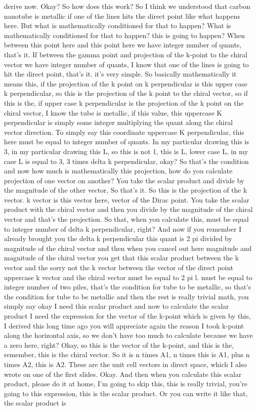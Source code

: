 derive now. Okay? So how does this work? So I think we understood that carbon nanotube is metallic if one of the lines hits the direct point like what happens here. But what is mathematically conditioned for that to happen? What is mathematically conditioned for that to happen? this is going to happen? When between this point here and this point here we have integer number of quants, that's it. If between the gamma point and projection of the k-point to the chiral vector we have integer number of quants, I know that one of the lines is going to hit the direct point, that's it. it's very simple. So basically mathematically it means this, if the projection of the k point on k perpendicular is this upper case k perpendicular, so this is the projection of the k point to the chiral vector, so if this is the, if upper case k perpendicular is the projection of the k point on the chiral vector, I know the tube is metallic, if this value, this uppercase K perpendicular is simply some integer multiplying the quant along the chiral vector direction. To simply say this coordinate uppercase K perpendicular, this here must be equal to integer number of quants. In my particular drawing this is 3, in my particular drawing this L, so this is not 1, this is L, lower case L, in my case L is equal to 3, 3 times delta k perpendicular, okay? So that's the condition and now how much is mathematically this projection, how do you calculate projection of one vector on another? You take the scalar product and divide by the magnitude of the other vector, So that's it. So this is the projection of the k vector. k vector is this vector here, vector of the Dirac point. You take the scalar product with the chiral vector and then you divide by the magnitude of the chiral vector and that's the projection. So that, when you calculate this, must be equal to integer number of delta k perpendicular, right? And now if you remember I already brought you the delta k perpendicular this quant is 2 pi divided by magnitude of the chiral vector and then when you cancel out here magnitude and magnitude of the chiral vector you get that this scalar product between the k vector and the sorry not the k vector between the vector of the direct point uppercase k vector and the chiral vector must be equal to 2 pi l. must be equal to integer number of two piles, that's the condition for tube to be metallic, so that's the condition for tube to be metallic and then the rest is really trivial math, you simply say okay I need this scalar product and now to calculate the scalar product I need the expression for the vector of the k-point which is given by this, I derived this long time ago you will appreciate again the reason I took k-point along the horizontal axis, so we don't have too much to calculate because we have a zero here, right? Okay, so this is the vector of the k-point, and this is the, remember, this is the chiral vector. So it is n times A1, n times this is A1, plus n times A2, this is A2. These are the unit cell vectors in direct space, which I also wrote on one of the first slides. Okay. And then when you calculate this scalar product, please do it at home, I'm going to skip this, this is really trivial, you're going to this expression, this is the scalar product. Or you can write it like that, the scalar product is 